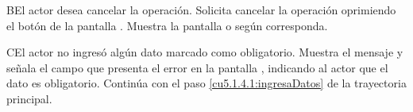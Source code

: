  \begin{UCtrayectoriaA}{B}{El actor desea cancelar la operación.}
    \UCpaso[\UCactor] Solicita cancelar la operación oprimiendo el botón  de la pantalla .
    \UCpaso[\UCsist] Muestra la pantalla  o  según corresponda.
 \end{UCtrayectoriaA}
 
 \begin{UCtrayectoriaA}{C}{El actor no ingresó algún dato marcado como obligatorio.}
    \UCpaso[\UCsist] Muestra el mensaje  y señala el campo que presenta el error en la pantalla , indicando al actor que el dato es obligatorio.
    \UCpaso[] Continúa con el paso \ref{cu5.1.4.1:ingresaDatos} de la trayectoria principal.
 \end{UCtrayectoriaA}
 
